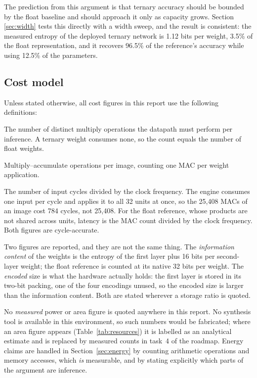\documentclass[11pt,a4paper]{article}
\begin{document}
The prediction from this argument is that ternary accuracy should be bounded by
the float baseline and should approach it only as capacity grows. Section~
\ref{sec:width} tests this directly with a width sweep, and the result is
consistent: the measured entropy of the deployed ternary network is 1.12 bits
per weight, 3.5\% of the float representation, and it recovers 96.5\% of the
reference's accuracy while using 12.5\% of the parameters.

\subsection{Cost model}

Unless stated otherwise, all cost figures in this report use the following
definitions:

\begin{description}[leftmargin=*,style=nextline]
\item[Multipliers.] The number of distinct multiply operations the datapath must
  perform per inference. A ternary weight consumes none, so the count equals
  the number of float weights.
\item[MACs.] Multiply--accumulate operations per image, counting one MAC per
  weight application.
\item[Latency.] The number of input cycles divided by the clock frequency. The
  engine consumes one input per cycle and applies it to all 32 units at once, so
  the 25{,}408 MACs of an image cost 784 cycles, not 25{,}408. For the float
  reference, whose products are not shared across units, latency is the MAC
  count divided by the clock frequency. Both figures are cycle-accurate.
\item[Weight storage.] Two figures are reported, and they are not the same
  thing. The \emph{information content} of the weights is the entropy of the
  first layer plus 16 bits per second-layer weight; the float reference is
  counted at its native 32 bits per weight. The \emph{encoded} size is what the
  hardware actually holds: the first layer is stored in its two-bit packing,
  one of the four encodings unused, so the encoded size is larger than the
  information content. Both are stated wherever a storage ratio is quoted.
\end{description}

No \emph{measured} power or area figure is quoted anywhere in this report. No
synthesis tool is available in this environment, so such numbers would be
fabricated; where an area figure appears (Table~\ref{tab:resources}) it is
labelled as an analytical estimate and is replaced by measured counts in task~4
of the roadmap. Energy claims are handled in Section~\ref{sec:energy} by
counting arithmetic operations and memory accesses, which \emph{is} measurable,
and by stating explicitly which parts of the argument are inference.
\end{document}
